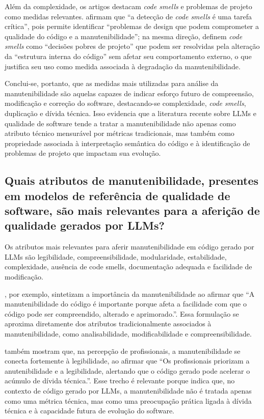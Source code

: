 Além da complexidade, os artigos destacam \textit{code smells} e problemas de projeto como medidas relevantes.  afirmam que ``a detecção de \textit{code smells} é uma tarefa crítica'', pois permite identificar ``problemas de design que podem comprometer a qualidade do código e a manutenibilidade''; na mesma direção,  definem \textit{code smells} como ``decisões pobres de projeto'' que podem ser resolvidas pela alteração da ``estrutura interna do código'' sem afetar seu comportamento externo, o que justifica seu uso como medida associada à degradação da manutenibilidade.

Conclui-se, portanto, que as medidas mais utilizadas para análise da manutenibilidade são aquelas capazes de indicar esforço futuro de compreensão, modificação e correção do software, destacando-se complexidade, \textit{code smells}, duplicação e dívida técnica. Isso evidencia que a literatura recente sobre LLMs e qualidade de software tende a tratar a manutenibilidade não apenas como atributo técnico mensurável por métricas tradicionais, mas também como propriedade associada à interpretação semântica do código e à identificação de problemas de projeto que impactam sua evolução.

\subsection{Quais atributos de manutenibilidade, presentes em modelos de referência de qualidade de software, são mais relevantes para a aferição de qualidade gerados por LLMs?}

Os atributos mais relevantes para aferir manutenibilidade em código gerado por LLMs são legibilidade, compreensibilidade, modularidade, estabilidade, complexidade, ausência de code smells, documentação adequada e facilidade de modificação. 

, por exemplo, sintetizam a importância da manutenibilidade ao afirmar que “A manutenibilidade do código é importante porque afeta a facilidade com que o código pode ser compreendido, alterado e aprimorado.”. Essa formulação se aproxima diretamente dos atributos tradicionalmente associados à manutenibilidade, como analisabilidade, modificabilidade e compreensibilidade.

 também mostram que, na percepção de profissionais, a manutenibilidade se conecta fortemente à legibilidade, ao afirmar que “Os profissionais priorizam a anutenibilidade e a legibilidade, alertando que o código gerado pode acelerar o acúmulo de dívida técnica.”. Esse trecho é relevante porque indica que, no contexto de código gerado por LLMs, a manutenibilidade não é tratada apenas como uma métrica técnica, mas como uma preocupação prática ligada à dívida técnica e à capacidade futura de evolução do software.

